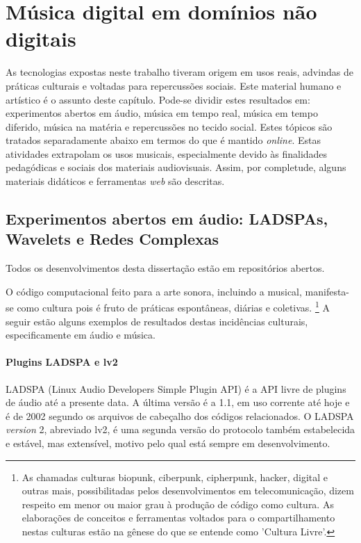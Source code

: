 \chapter{Música digital em domínios não digitais}
\label{cap:musicaExtra}

As tecnologias expostas neste trabalho tiveram origem em
usos reais, advindas
de práticas culturais e voltadas para repercussões sociais.
Este material humano e artístico é o assunto deste
capítulo.
Pode-se dividir estes resultados em:
experimentos abertos em áudio,
música em tempo real,
música em tempo diferido,
música na matéria e
repercussões no tecido social.
Estes tópicos são tratados separadamente
abaixo em termos do que é
mantido \emph{online}.
Estas atividades extrapolam os usos musicais, especialmente devido às
finalidades pedagódicas e sociais dos materiais audiovisuais.
Assim, por completude, alguns materiais didáticos
e ferramentas \emph{web} são descritas.

\section{Experimentos abertos em áudio: LADSPAs, Wavelets e Redes Complexas}

Todos os desenvolvimentos desta dissertação estão em repositórios
abertos.\cite{repoDissertacao}

O código computacional feito para a arte sonora, incluindo a musical,
 manifesta-se como cultura pois é fruto de práticas
espontâneas, diárias e coletivas.
\footnote{As chamadas culturas biopunk, ciberpunk, cipherpunk, hacker,
  digital e outras mais, possibilitadas pelos desenvolvimentos
  em telecomunicação, dizem respeito em menor ou maior grau à produção
  de código como cultura. As elaborações de conceitos e ferramentas
  voltados para o compartilhamento nestas culturas estão na gênese do que
  se entende como 'Cultura Livre'.}
A seguir estão alguns exemplos de resultados
destas incidências culturais,
especificamente em áudio
 e música.

\subsubsection{Plugins LADSPA e lv2}

LADSPA (Linux Audio Developers Simple Plugin API) é a API
livre de plugins de áudio até a presente data. A
última versão é a 1.1, em uso corrente até hoje e é
de 2002 segundo os arquivos de cabeçalho dos códigos relacionados.
O LADSPA \emph{version} 2, abreviado lv2, é uma segunda versão do
protocolo também estabelecida e estável, mas extensível, motivo pelo
qual está sempre em desenvolvimento.

